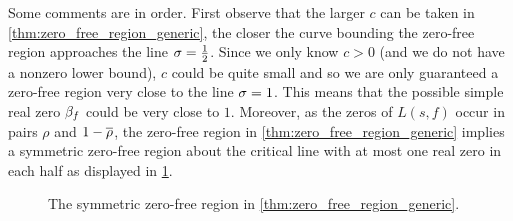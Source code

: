     Some comments are in order. First observe that the larger $c$ can be taken in \cref{thm:zero_free_region_generic}, the closer the curve bounding the zero-free region approaches the line $\sigma = \frac{1}{2}$. Since we only know $c > 0$ (and we do not have a nonzero lower bound), $c$ could be quite small and so we are only guaranteed a zero-free region very close to the line $\sigma = 1$. This means that the possible simple real zero $\beta_{f}$ could be very close to $1$. Moreover, as the zeros of $L(s,f)$ occur in pairs $\rho$ and $1-\overline{\rho}$, the zero-free region in \cref{thm:zero_free_region_generic} implies a symmetric zero-free region about the critical line with at most one real zero in each half as displayed in \cref{fig:symmetric_zero_free_region}.

    \begin{figure}[ht]
      \centering
      \caption{The symmetric zero-free region in \cref{thm:zero_free_region_generic}.}
      \label{fig:symmetric_zero_free_region}
    \end{figure}

